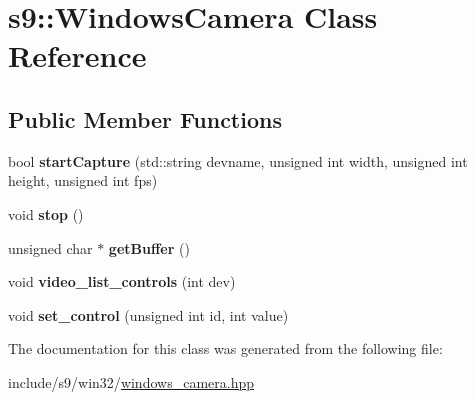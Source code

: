 \hypertarget{classs9_1_1WindowsCamera}{\section{s9\-:\-:\-Windows\-Camera \-Class \-Reference}
\label{classs9_1_1WindowsCamera}
}
\subsection*{\-Public \-Member \-Functions}
\begin{DoxyCompactItemize}
\item 
\hypertarget{classs9_1_1WindowsCamera_aa51929a1320b998f49f48ac2924202ad}{bool {\bfseries start\-Capture} (std\-::string devname, unsigned int width, unsigned int height, unsigned int fps)}\label{classs9_1_1WindowsCamera_aa51929a1320b998f49f48ac2924202ad}

\item 
\hypertarget{classs9_1_1WindowsCamera_affd8788e83b2ae39b1797e83c7cf4217}{void {\bfseries stop} ()}\label{classs9_1_1WindowsCamera_affd8788e83b2ae39b1797e83c7cf4217}

\item 
\hypertarget{classs9_1_1WindowsCamera_aebfa3f5d5e8716c46a7d0db72dd699eb}{unsigned char $\ast$ {\bfseries get\-Buffer} ()}\label{classs9_1_1WindowsCamera_aebfa3f5d5e8716c46a7d0db72dd699eb}

\item 
\hypertarget{classs9_1_1WindowsCamera_a5f0c28c90d3a0c9841e8ea6ba2f45314}{void {\bfseries video\-\_\-list\-\_\-controls} (int dev)}\label{classs9_1_1WindowsCamera_a5f0c28c90d3a0c9841e8ea6ba2f45314}

\item 
\hypertarget{classs9_1_1WindowsCamera_ade1fc2128f889de808ecf33ae25c49a0}{void {\bfseries set\-\_\-control} (unsigned int id, int value)}\label{classs9_1_1WindowsCamera_ade1fc2128f889de808ecf33ae25c49a0}

\end{DoxyCompactItemize}


\-The documentation for this class was generated from the following file\-:\begin{DoxyCompactItemize}
\item 
include/s9/win32/\hyperlink{windows__camera_8hpp}{windows\-\_\-camera.\-hpp}\end{DoxyCompactItemize}
